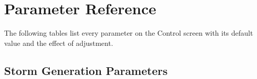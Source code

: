 \documentclass[11pt,a4paper]{article}
\begin{document}
\section{Parameter Reference}
\label{ch:reference}

The following tables list every parameter on the Control screen with its
default value and the effect of adjustment.

\subsection{Storm Generation Parameters}
\end{document}
